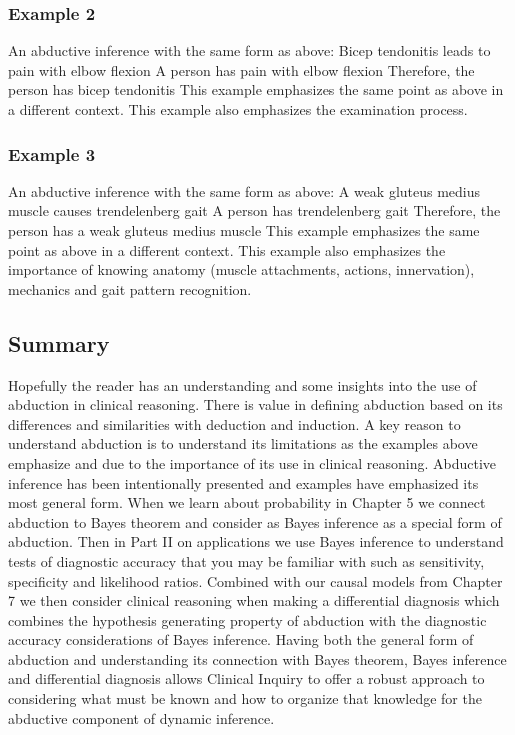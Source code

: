 \documentclass[
]{book}
\begin{document}
\hypertarget{example-2-1}{%
\subsubsection{Example 2}\label{example-2-1}}

An abductive inference with the same form as above:
Bicep tendonitis leads to pain with elbow flexion
A person has pain with elbow flexion
Therefore, the person has bicep tendonitis
This example emphasizes the same point as above in a different context. This example also emphasizes the examination process.

\hypertarget{example-3-1}{%
\subsubsection{Example 3}\label{example-3-1}}

An abductive inference with the same form as above:
A weak gluteus medius muscle causes trendelenberg gait
A person has trendelenberg gait
Therefore, the person has a weak gluteus medius muscle
This example emphasizes the same point as above in a different context. This example also emphasizes the importance of knowing anatomy (muscle attachments, actions, innervation), mechanics and gait pattern recognition.

\hypertarget{summary-1}{%
\subsection{Summary}\label{summary-1}}

Hopefully the reader has an understanding and some insights into the use of abduction in clinical reasoning. There is value in defining abduction based on its differences and similarities with deduction and induction. A key reason to understand abduction is to understand its limitations as the examples above emphasize and due to the importance of its use in clinical reasoning.
Abductive inference has been intentionally presented and examples have emphasized its most general form. When we learn about probability in Chapter 5 we connect abduction to Bayes theorem and consider as Bayes inference as a special form of abduction. Then in Part II on applications we use Bayes inference to understand tests of diagnostic accuracy that you may be familiar with such as sensitivity, specificity and likelihood ratios. Combined with our causal models from Chapter 7 we then consider clinical reasoning when making a differential diagnosis which combines the hypothesis generating property of abduction with the diagnostic accuracy considerations of Bayes inference. Having both the general form of abduction and understanding its connection with Bayes theorem, Bayes inference and differential diagnosis allows Clinical Inquiry to offer a robust approach to considering what must be known and how to organize that knowledge for the abductive component of dynamic inference.
\end{document}
